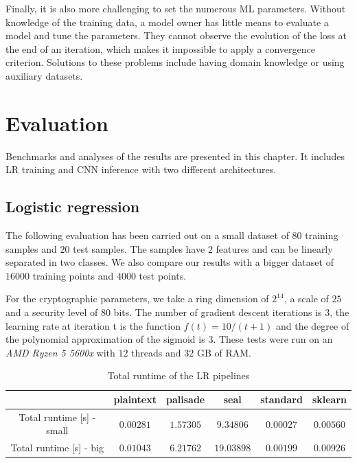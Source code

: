 \documentclass[a4paper,11pt,oneside]{report}
\begin{document}
Finally, it is also more challenging to set the numerous ML parameters.
Without knowledge of the training data, a model owner has little means to evaluate a model and tune the parameters.
They cannot observe the evolution of the loss at the end of an iteration, which makes it impossible to apply a convergence criterion.
Solutions to these problems include having domain knowledge or using auxiliary datasets.


\chapter{Evaluation}\label{chap:evaluation}


Benchmarks and analyses of the results are presented in this chapter. 
It includes LR training and CNN inference with two different architectures.

\section{Logistic regression}\label{sec:eval_lr}

The following evaluation has been carried out on a small dataset of $80$ training samples and $20$ test samples. 
The samples have $2$ features and can be linearly separated in two classes.
We also compare our results with a bigger dataset of $16000$ training points and $4000$ test points.

For the cryptographic parameters, we take a ring dimension of $2^{14}$, a scale of $25$ and a security level of $80$ bits. 
The number of gradient descent iterations is $3$, the learning rate at iteration t is the function $f(t) = 10 / (t+1)$ and the degree of the polynomial approximation of the sigmoid is $3$.
These tests were run on an \emph{AMD Ryzen 5 5600x} with $12$ threads and $32$ GB of RAM.

\begin{table}[h!]
  \begin{center}
    \caption{Total runtime of the LR pipelines}
    \label{table:lr_runtime}
    \begin{tabular}{ c c c c c c }
    \hline
     & plaintext & palisade & seal & standard & sklearn \\
    \hline
    Total runtime [s] - small & $0.00281$ & $1.57305$ & $9.34806$ & $0.00027$ & $0.00560$ \\
    Total runtime [s] - big & $0.01043$ & $6.21762$ & $19.03898$ & $0.00199$ & $0.00926$ \\
    \hline
    \end{tabular}
  \end{center}
\end{table}
\end{document}
